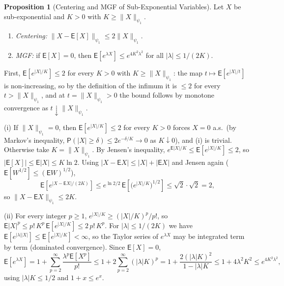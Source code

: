 \documentclass[12pt,a4paper]{article}
\makeatletter
\theoremstyle{definition}
\newtheorem{proposition}[theorem]{Proposition}
\renewenvironment{proof}[1][\proofname]{\par
  \pushQED{\qed}%
  \normalfont \topsep6\p@\@plus6\p@\relax
  \trivlist
  \item[\hskip\labelsep\bfseries #1\@addpunct{.}]\ignorespaces
}{%
  \popQED\endtrivlist\@endpefalse
}
\newcommand\expc{\mathsf{E}}
\newcommand\prb{\mathsf{P}}
\makeatother
\begin{document}
\begin{proposition}[Centering and MGF of Sub-Exponential Variables]\label{prop:subexp-mgf}
Let $X$ be sub-exponential and $K > 0$ with $K \geqslant \|X\|_{\psi_1}$.
\begin{enumerate}[label=\textup{(\roman*)}]
\item \emph{Centering:} $\|X - \expc[X]\|_{\psi_1} \leqslant 2\|X\|_{\psi_1}$.
\item \emph{MGF:} if $\expc[X] = 0$, then $\expc[e^{\lambda X}] \leqslant e^{4K^2\lambda^2}$ for all $|\lambda| \leqslant 1/(2K)$.
\end{enumerate}
\end{proposition}

\begin{proof}
First, $\expc[e^{|X|/K}] \leqslant 2$ for every $K > 0$ with $K \geqslant \|X\|_{\psi_1}$: the map $t \mapsto \expc[e^{|X|/t}]$ is non-increasing, so by the definition of the infimum it is $\leqslant 2$ for every $t > \|X\|_{\psi_1}$, and at $t = \|X\|_{\psi_1} > 0$ the bound follows by monotone convergence as $t \downarrow \|X\|_{\psi_1}$.

(i) If $\|X\|_{\psi_1} = 0$, then $\expc[e^{|X|/K}] \leqslant 2$ for every $K > 0$ forces $X = 0$ a.s.\ (by Markov's inequality, $\prb(|X| \geqslant \delta) \leqslant 2e^{-\delta/K} \to 0$ as $K \downarrow 0$), and (i) is trivial. Otherwise take $K = \|X\|_{\psi_1}$. By Jensen's inequality, $e^{\expc|X|/K} \leqslant \expc[e^{|X|/K}] \leqslant 2$, so $|\expc[X]| \leqslant \expc|X| \leqslant K\ln 2$. Using $|X - \expc X| \leqslant |X| + |\expc X|$ and Jensen again ($\expc[W^{1/2}] \leqslant (\expc W)^{1/2}$),
\[
\expc\!\left[e^{|X - \expc X|/(2K)}\right] \leqslant e^{\ln 2/2}\,\expc\!\left[\big(e^{|X|/K}\big)^{1/2}\right] \leqslant \sqrt{2}\cdot\sqrt{2} = 2,
\]
so $\|X - \expc X\|_{\psi_1} \leqslant 2K$.

(ii) For every integer $p \geqslant 1$, $e^{|X|/K} \geqslant (|X|/K)^p/p!$, so $\expc|X|^p \leqslant p!\,K^p\,\expc[e^{|X|/K}] \leqslant 2\,p!\,K^p$. For $|\lambda| \leqslant 1/(2K)$ we have $\expc[e^{|\lambda||X|}] \leqslant \expc[e^{|X|/K}] < \infty$, so the Taylor series of $e^{\lambda X}$ may be integrated term by term (dominated convergence). Since $\expc[X] = 0$,
\[
\expc[e^{\lambda X}] = 1 + \sum_{p=2}^\infty \frac{\lambda^p\expc[X^p]}{p!} \leqslant 1 + 2\sum_{p=2}^\infty (|\lambda|K)^p = 1 + \frac{2(|\lambda|K)^2}{1 - |\lambda|K} \leqslant 1 + 4\lambda^2K^2 \leqslant e^{4K^2\lambda^2},
\]
using $|\lambda|K \leqslant 1/2$ and $1 + x \leqslant e^x$.
\end{proof}
\end{document}
